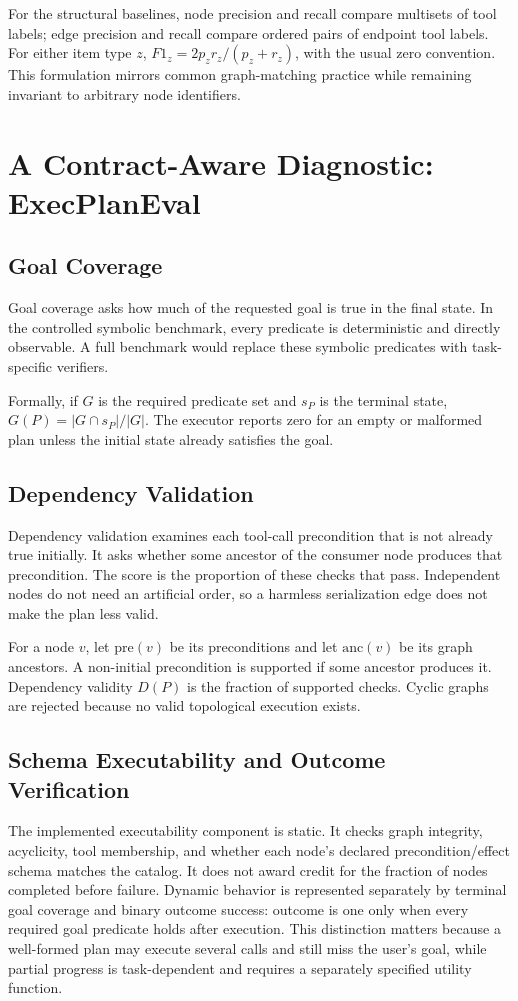 \documentclass[10pt]{article}
\begin{document}
For the structural baselines, node precision and recall compare multisets of
tool labels; edge precision and recall compare ordered pairs of endpoint tool
labels. For either item type $z$, $F1_z=2p_zr_z/(p_z+r_z)$, with the usual
zero convention. This formulation mirrors common graph-matching practice while
remaining invariant to arbitrary node identifiers.

\section{A Contract-Aware Diagnostic: ExecPlanEval}
\subsection{Goal Coverage}
Goal coverage asks how much of the requested goal is true in the final state.
In the controlled symbolic benchmark, every predicate is deterministic and directly
observable. A full benchmark would replace these symbolic predicates with
task-specific verifiers.

Formally, if $G$ is the required predicate set and $s_P$ is the terminal state,
$G(P)=|G\cap s_P|/|G|$. The executor reports zero for an empty or malformed
plan unless the initial state already satisfies the goal.

\subsection{Dependency Validation}
Dependency validation examines each tool-call precondition that is not already
true initially. It asks whether some ancestor of the consumer node produces
that precondition. The score is the proportion of these checks that pass.
Independent nodes do not need an artificial order, so a harmless serialization
edge does not make the plan less valid.

For a node $v$, let $\mathrm{pre}(v)$ be its preconditions and let
$\mathrm{anc}(v)$ be its graph ancestors. A non-initial precondition is
supported if some ancestor produces it. Dependency validity $D(P)$ is the
fraction of supported checks. Cyclic graphs are rejected because no valid
topological execution exists.

\subsection{Schema Executability and Outcome Verification}
The implemented executability component is static. It checks graph integrity,
acyclicity, tool membership, and whether each node's declared
precondition/effect schema matches the catalog. It does not award credit for the
fraction of nodes completed before failure. Dynamic behavior is represented
separately by terminal goal coverage and binary outcome success: outcome is one
only when every required goal predicate holds after execution. This distinction
matters because a well-formed plan may execute several calls and still miss the
user's goal, while partial progress is task-dependent and requires a separately
specified utility function.
\end{document}
